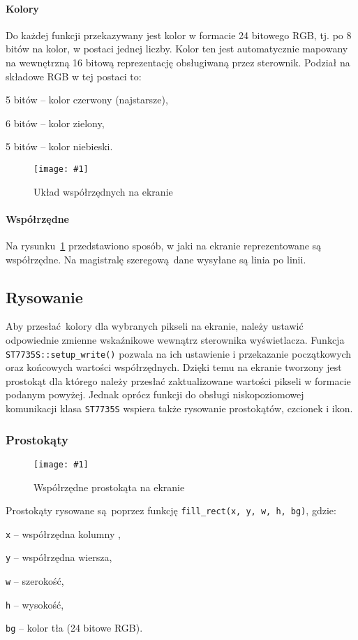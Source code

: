 \documentclass[polish]{aghengthesis}
\let\tempone\itemize
\let\temptwo\enditemize
\renewenvironment{itemize}{\tempone\setlength{\itemsep}{0cm}}{\temptwo}
\newcommand{\imgint}[4]{
	\begin{figure}[{#4}]
		\centering
		\texttt{[image: \#1]}
		\caption{#2}
		\label{#1}
	\end{figure}
}
\newcommand{\imgh}[3]{\imgint{#1}{#2}{#3}{H}}
\begin{document}
		\paragraph{Kolory}
			Do każdej funkcji przekazywany jest kolor w formacie 24 bitowego RGB, tj. po 8 bitów na kolor, w postaci jednej liczby. Kolor ten jest automatycznie mapowany na wewnętrzną 16 bitową reprezentację obsługiwaną przez sterownik. Podział na składowe RGB w tej postaci to:
			\begin{itemize}
				\item 5 bitów -- kolor czerwony (najstarsze),
				\item 6 bitów -- kolor zielony,
				\item 5 bitów -- kolor niebieski.
			\end{itemize}
		
		\imgh{3/PicoRadio-screen-xy}{Układ współrzędnych na ekranie}{0.45}
		\paragraph{Współrzędne}
			Na rysunku~\ref{3/PicoRadio-screen-xy} przedstawiono sposób, w jaki na ekranie reprezentowane są współrzędne. Na magistralę szeregową dane wysyłane są linia po linii.
		
		\subsection{Rysowanie}
			Aby przesłać kolory dla wybranych pikseli na ekranie, należy ustawić odpowiednie zmienne wskaźnikowe wewnątrz sterownika wyświetlacza. Funkcja \lstinline|ST7735S::setup_write()| pozwala na ich ustawienie i przekazanie początkowych oraz końcowych wartości współrzędnych. Dzięki temu na ekranie tworzony jest prostokąt dla którego należy przesłać zaktualizowane wartości pikseli w formacie podanym powyżej. Jednak oprócz funkcji do obsługi niskopoziomowej komunikacji klasa \lstinline|ST7735S|  wspiera także rysowanie prostokątów, czcionek i ikon.
			
			\subsubsection{Prostokąty}
				\imgh{3/PicoRadio-screen-rect}{Współrzędne prostokąta na ekranie}{0.6}
				Prostokąty rysowane są poprzez funkcję \lstinline|fill_rect(x, y, w, h, bg)|, gdzie:
				\begin{itemize}
					\item \lstinline|x| -- współrzędna kolumny ,
					\item \lstinline|y| -- współrzędna wiersza,
					\item \lstinline|w| -- szerokość,
					\item \lstinline|h| -- wysokość,
					\item \lstinline|bg| -- kolor tła (24 bitowe RGB).
				\end{itemize}
			
\end{document}
